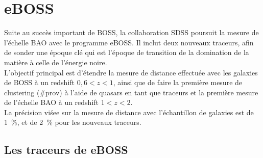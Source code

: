 \documentclass[11pt, twoside, a4paper, openright]{report}
\begin{document}
\section{eBOSS}

Suite au succès important de BOSS, la collaboration SDSS poursuit la mesure de l'échelle BAO avec le programme eBOSS. Il inclut deux nouveaux traceurs, afin de sonder une époque clé qui est l'époque de transition de la domination de la matière à celle de l'énergie noire. \\
L'objectif principal est d'étendre la mesure de distance effectuée avec les galaxies de BOSS à un redshift $0,6 < z < 1$, ainsi que de faire la première mesure de clustering (\#prov) à l'aide de quasars en tant que traceurs et la première mesure de l'échelle BAO à un redshift $1 < z < 2$. \\
La précision viśee sur la mesure de distance avec l'échantillon de galaxies est de 1~\%, et de 2~\% pour les nouveaux traceurs.



\subsection{Les traceurs de eBOSS}
\end{document}
